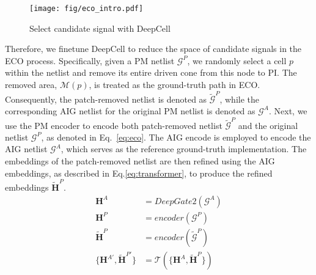 \begin{figure} [!t]
    \centering
    \texttt{[image: fig/eco\_intro.pdf]}
    \vspace{-10pt}
    \caption{Select candidate signal with DeepCell}
    \label{fig:eco_intro}
    \vspace{-15pt}   
\end{figure}

Therefore, we finetune DeepCell to reduce the space of candidate signals in the ECO process. Specifically, given a PM netlist $\mathcal{G}^P$, we randomly select a cell $p$ within the netlist and remove its entire driven cone from this node to PI. The removed area, $\mathcal{M}(p)$, is treated as the ground-truth path in ECO. Consequently, the patch-removed netlist is denoted as $\widetilde{\mathcal{G}}^P$, while the corresponding AIG netlist for the original PM netlist is denoted as $\mathcal{G}^A$. Next, we use the PM encoder to encode both patch-removed netlist $\widetilde{\mathcal{G}}^P$ and the original netlist $\mathcal{G}^P$, as denoted in Eq.~\eqref{eq:eco}. The AIG encode is employed to encode the AIG netlist $\mathcal{G}^A$, which serves as the reference ground-truth implementation. The embeddings of the patch-removed netlist are then refined using the AIG embeddings, as described in Eq.\eqref{eq:transformer}, to produce the refined embeddings $\widetilde{\mathbf{H}}^{P}$. 
\begin{equation} \label{eq:eco}
    \begin{split}
        \mathbf{H}^A & = DeepGate2(\mathcal{G}^A) \\
        \mathbf{H}^P & = encoder(\mathcal{G}^P) \\
        \widetilde{\mathbf{H}}^{P} & = encoder(\widetilde{\mathcal{G}}^P) \\
        \{\mathbf{H}^{A'}, \widetilde{\mathbf{H}}^{P'}\} & = \mathcal{T}(\{\mathbf{H}^{A}, \widetilde{\mathbf{H}}^{P}\})
    \end{split}
\end{equation}


